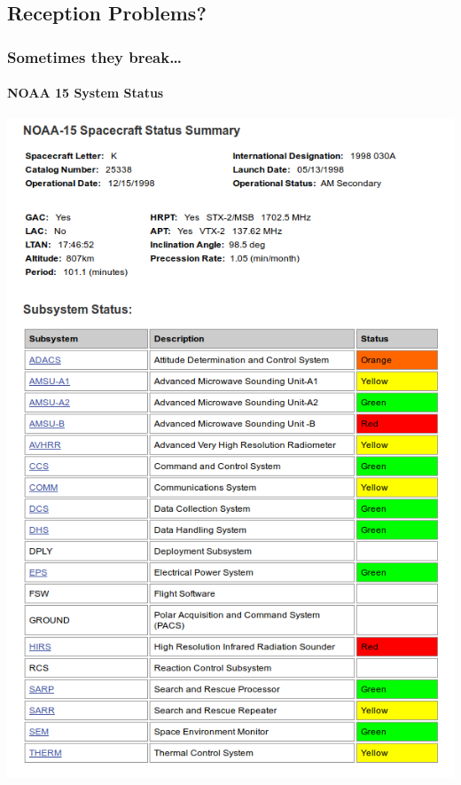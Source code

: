 \documentclass[]{beamer}
\begin{document}
\subsection{Reception Problems?}
\begin{frame}
    \frametitle{Sometimes they break\dots}
    \framesubtitle{NOAA 15 System Status}
    \begin{center}
        \includegraphics[width=0.75\paperwidth,height=0.75\paperheight,keepaspectratio]{images/noaa-15-status.png}
    \end{center}
\end{frame}
\end{document}
